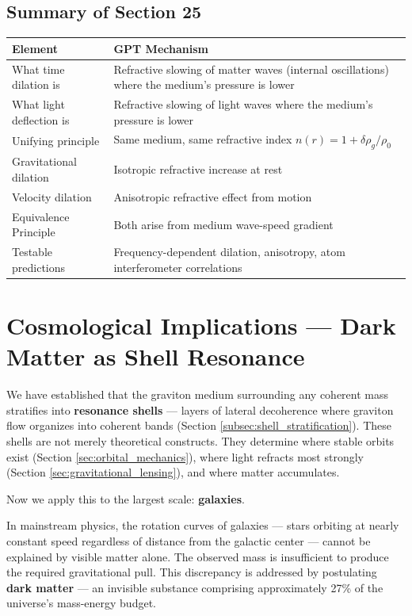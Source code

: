 \documentclass[12pt, a4paper]{article}
\begin{document}
\subsection{Summary of Section 25}
\label{subsec:summary_25}

\begin{center}
\begin{tabular}{|p{4cm}|p{10cm}|}
\hline
\textbf{Element} & \textbf{GPT Mechanism} \\
\hline
What time dilation is & Refractive slowing of matter waves (internal oscillations) where the medium's pressure is lower \\
\hline
What light deflection is & Refractive slowing of light waves where the medium's pressure is lower \\
\hline
Unifying principle & Same medium, same refractive index \( n(r) = 1 + \delta \rho_g/\rho_0 \) \\
\hline
Gravitational dilation & Isotropic refractive increase at rest \\
\hline
Velocity dilation & Anisotropic refractive effect from motion \\
\hline
Equivalence Principle & Both arise from medium wave-speed gradient \\
\hline
Testable predictions & Frequency-dependent dilation, anisotropy, atom interferometer correlations \\
\hline
\end{tabular}
\end{center}
\section{Cosmological Implications — Dark Matter as Shell Resonance}
\label{sec:dark_matter_shell}

We have established that the graviton medium surrounding any coherent mass stratifies into \textbf{resonance shells} — layers of lateral decoherence where graviton flow organizes into coherent bands (Section \ref{subsec:shell_stratification}). These shells are not merely theoretical constructs. They determine where stable orbits exist (Section \ref{sec:orbital_mechanics}), where light refracts most strongly (Section \ref{sec:gravitational_lensing}), and where matter accumulates.

Now we apply this to the largest scale: \textbf{galaxies}.

In mainstream physics, the rotation curves of galaxies — stars orbiting at nearly constant speed regardless of distance from the galactic center — cannot be explained by visible matter alone. The observed mass is insufficient to produce the required gravitational pull. This discrepancy is addressed by postulating \textbf{dark matter} — an invisible substance comprising approximately 27\% of the universe's mass-energy budget.
\end{document}
